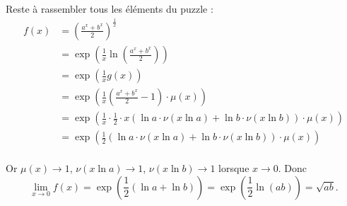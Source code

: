 {{\bigskip

Reste à rassembler tous les éléments du puzzle :
\begin{align*}
 f(x) &= \left(\frac{a^{x}+b^{x}}{2}\right)^{\frac{1}{x}} \\
      &= \exp\left( \frac 1x \ln \left(\frac{a^{x}+b^{x}}{2}\right) \right) \\
      &= \exp\left( \frac 1x g(x) \right) \\
      &= \exp\left( \frac 1x  \left(\frac{a^{x}+b^{x}}{2}-1\right) \cdot \mu(x) \right) \\
      &= \exp\left( \frac 1x  \cdot \frac12  \cdot x\left(\ln a \cdot \nu(x \ln a) +  \ln b \cdot \nu(x \ln b) \right) \cdot \mu(x) \right) \\
      &= \exp\left( \frac12 \left(\ln a \cdot \nu(x \ln a) +  \ln b \cdot \nu(x \ln b) \right) \cdot \mu(x) \right) \\
\end{align*}

Or $\mu(x) \to 1$, $\nu(x \ln a) \to 1$, $\nu(x \ln b) \to 1$ lorsque $x \to 0$.
Donc 
$$\lim_{x\to 0} f(x) = \exp\left( \frac12 \left(\ln a + \ln b \right) \right) = \exp\left( \frac12 \ln (ab) \right) = \sqrt{ab}.$$
}
}
